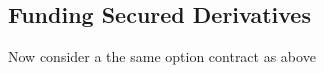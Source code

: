\documentclass[../main.tex]{subfiles}
\begin{document}
    \subsection{Funding Secured Derivatives}
        Now consider a the same option contract as above 
\end{document}
